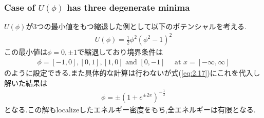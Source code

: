 \documentclass[dvipdfmx,11pt,a4paper]{jsbook}
\begin{document}
\subsubsection{Case of $U(\phi)$ has three degenerate minima}
$U(\phi)$が3つの最小値をもつ縮退した例として以下のポテンシャルを考える.
\begin{align*}
    U(\phi)=\frac{1}{2} \phi^{2}\left(\phi^{2}-1\right)^{2}
\end{align*}
この最小値は$\phi=0,\pm1$で縮退しており境界条件は
\begin{align*}
    \phi=[-1,0],[0,1],[1,0] \text { and }[0,-1] \quad \text { at } x=[-\infty, \infty]
\end{align*}
のように設定できる.また具体的な計算は行わないが式(\ref{eq:2.17})にこれを代入し解いた結果は
\begin{align}
    \phi=\pm\left(1+e^{\pm 2 x}\right)^{-\frac{1}{2}}
\end{align}
となる.この解もlocalizeしたエネルギー密度をもち,全エネルギーは有限となる.
\end{document}
